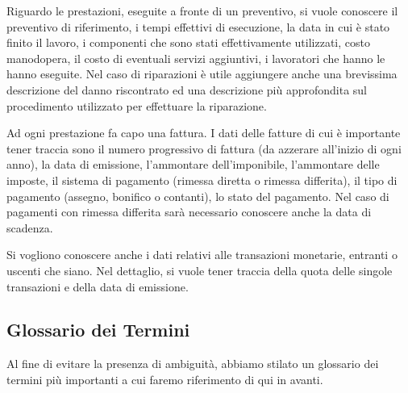 		Riguardo le prestazioni, eseguite a fronte di un preventivo, si vuole conoscere il preventivo di riferimento, i tempi effettivi di esecuzione, la data in cui è stato finito il lavoro, i componenti che sono stati effettivamente utilizzati, costo manodopera, il costo di eventuali servizi aggiuntivi, i lavoratori che hanno le hanno eseguite.
		Nel caso di riparazioni è utile aggiungere anche una brevissima descrizione del danno riscontrato ed una descrizione più approfondita sul procedimento utilizzato per effettuare la riparazione.
		
		Ad ogni prestazione fa capo una fattura. I dati delle fatture di cui è importante tener traccia sono il numero progressivo di fattura (da azzerare all'inizio di ogni anno), la data di emissione, l'ammontare dell'imponibile, l'ammontare delle imposte, il sistema di pagamento (rimessa diretta o rimessa differita), il tipo di pagamento (assegno, bonifico o contanti), lo stato del pagamento. Nel caso di pagamenti con rimessa differita sarà necessario conoscere anche la data di scadenza.
		
		Si vogliono conoscere anche i dati relativi alle transazioni monetarie, entranti o uscenti che siano. Nel dettaglio, si vuole tener traccia della quota delle singole transazioni e della data di emissione.
		
	\subsection{Glossario dei Termini}
	
		Al fine di evitare la presenza di ambiguità, abbiamo stilato un glossario dei termini più importanti a cui faremo riferimento di qui in avanti.
						
